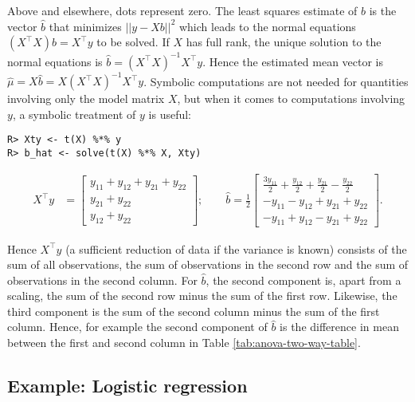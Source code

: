 Above and elsewhere, dots represent zero.
The least squares estimate of \(b\) is the vector \(\hat{b}\) that minimizes \(||y-X b||^2\) which leads to the normal equations \((X^\top X)b = X^\top y\) to be solved. If \(X\) has full rank, the unique solution to the normal
equations is \(\hat{b} = (X^\top X)^{-1} X^\top y\). Hence the
estimated mean vector is \(\hat \mu = X\hat{b}=X(X^\top X)^{-1} X^\top y\). Symbolic computations are
not needed for quantities involving only the model matrix \(X\), but
when it comes to computations involving \(y\), a symbolic treatment of
\(y\) is useful:

\begin{verbatim}
R> Xty <- t(X) %*% y
R> b_hat <- solve(t(X) %*% X, Xty)
\end{verbatim}

\begin{align}
X^\top y &= \left[\begin{matrix}y_{11} + y_{12} + y_{21} + y_{22}\\y_{21} + y_{22}\\y_{12} + y_{22}\end{matrix}\right]; \quad 
\quad
\hat{b} = \frac{1}{2}  \left[\begin{matrix}\frac{3 y_{11}}{2} + \frac{y_{12}}{2} + \frac{y_{21}}{2} - \frac{y_{22}}{2}\\- y_{11} - y_{12} + y_{21} + y_{22}\\- y_{11} + y_{12} - y_{21} + y_{22}\end{matrix}\right].
\end{align}

Hence \(X^\top y\) (a sufficient reduction of data if the variance is
known) consists of the sum of all observations, the sum of
observations in the second row and the sum of observations in the
second column. For \(\hat{b}\), the second component is, apart from a
scaling, the sum of the second row minus the sum of the first
row. Likewise, the third component is the sum of the second column
minus the sum of the first column. Hence, for example the second
component of \(\hat{b}\) is the difference in mean between the first and
second column in Table \ref{tab:anova-two-way-table}.

\hypertarget{example-logistic-regression}{%
\subsection{Example: Logistic regression}\label{example-logistic-regression}}

